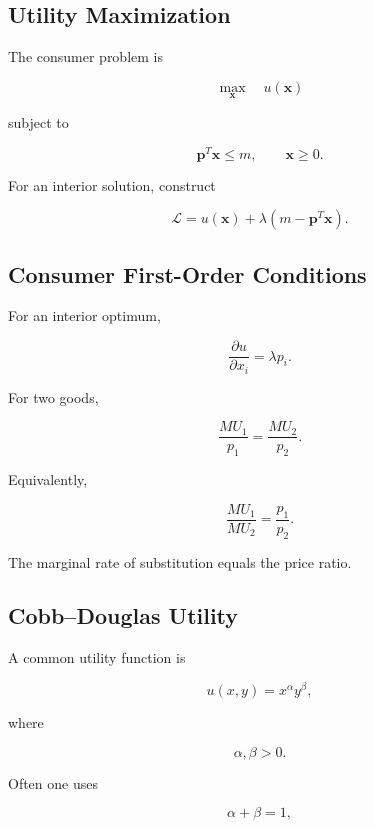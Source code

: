 \subsection{Utility Maximization}
\label{subsec:utility-maximization}

The consumer problem is

\[
\boxed{
\max_{\mathbf{x}}
\quad
u(\mathbf{x})
}
\]

subject to

\[
\boxed{
\mathbf{p}^T\mathbf{x}
\leq
m,
\qquad
\mathbf{x}\geq0.
}
\]

For an interior solution, construct

\[
\boxed{
\mathcal{L}
=
u(\mathbf{x})
+
\lambda
\left(
m-\mathbf{p}^T\mathbf{x}
\right).
}
\]

\subsection{Consumer First-Order Conditions}
\label{subsec:consumer-first-order-conditions}

For an interior optimum,

\[
\boxed{
\frac{\partial u}{\partial x_i}
=
\lambda p_i.
}
\]

For two goods,

\[
\frac{MU_1}{p_1}
=
\frac{MU_2}{p_2}.
\]

Equivalently,

\[
\boxed{
\frac{MU_1}{MU_2}
=
\frac{p_1}{p_2}.
}
\]

The marginal rate of substitution equals the price ratio.

\subsection{Cobb--Douglas Utility}
\label{subsec:cobb-douglas-utility}

A common utility function is

\[
\boxed{
u(x,y)
=
x^\alpha y^\beta,
}
\]

where

\[
\alpha,\beta>0.
\]

Often one uses

\[
\alpha+\beta=1,
\]

